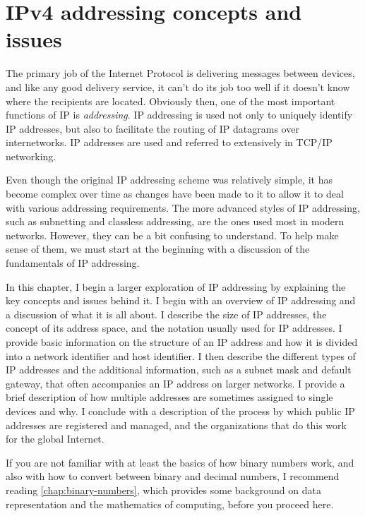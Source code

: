 \chapter{IPv4 addressing concepts and issues}
\label{chap:kozierok-ch16}

The primary job of the Internet Protocol is delivering messages between devices, and like any good delivery service, it can't do its job
too well if it doesn't know where the recipients are located.
Obviously then, one of the most important functions of IP is \emph{addressing}.
IP addressing is used not only to uniquely identify IP addresses, but also to facilitate the routing of IP datagrams over internetworks.
IP addresses are used and referred to extensively in TCP/IP networking.

Even though the original IP addressing scheme was relatively simple, it has become complex over time as changes have been made to it to allow it
to deal with various addressing requirements.
The more advanced styles of IP addressing, such as subnetting and classless addressing, are the ones used most in modern networks.
However, they can be a bit confusing to understand.
To help make sense of them, we must start at the beginning with a discussion of the fundamentals of IP addressing.

In this chapter, I begin a larger exploration of IP addressing
by explaining the key concepts and issues behind it. I begin with an
overview of IP addressing and a discussion of what it is all about. I
describe the size of IP addresses, the concept of its address space, and
the notation usually used for IP addresses. I provide basic information
on the structure of an IP address and how it is divided into a network
identifier and host identifier. I then describe the different types of
IP addresses and the additional information, such as a subnet mask and
default gateway, that often accompanies an IP address on larger
networks. I provide a brief description of how multiple addresses are
sometimes assigned to single devices and why. I conclude with a
description of the process by which public IP addresses are registered
and managed, and the organizations that do this work for the global
Internet.

\begin{backgroundinfo}
If you are not familiar with at least the basics of how binary numbers work, and also with how to
convert between binary and decimal numbers, I recommend reading \vref{chap:binary-numbers}, which provides some background
on data representation and the mathematics of computing, before you proceed here.
\end{backgroundinfo}




